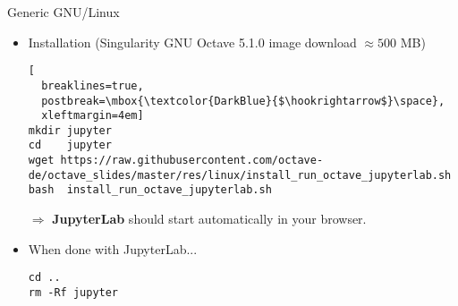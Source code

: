 \begin{frame}[fragile]{Generic GNU/Linux}
\begin{itemize}
\itemsep2em
\item Installation
({\color{DarkBlue}Singularity} GNU Octave 5.1.0 image download $\approx 500$ MB)
\begin{lstlisting}[
  breaklines=true,
  postbreak=\mbox{\textcolor{DarkBlue}{$\hookrightarrow$}\space},
  xleftmargin=4em]
mkdir jupyter
cd    jupyter
wget https://raw.githubusercontent.com/octave-de/octave_slides/master/res/linux/install_run_octave_jupyterlab.sh
bash  install_run_octave_jupyterlab.sh
\end{lstlisting}
$\Rightarrow$ \textbf{JupyterLab} should start automatically
in your browser.

\item When done with JupyterLab...
\begin{lstlisting}[xleftmargin=4em]
cd ..
rm -Rf jupyter
\end{lstlisting}
\end{itemize}
\end{frame}
